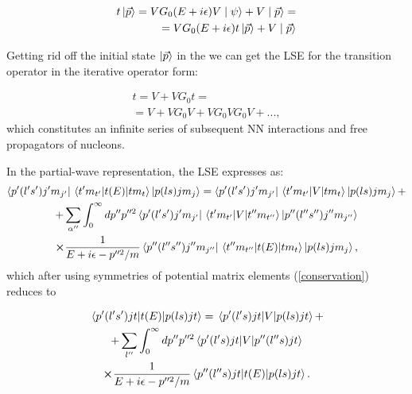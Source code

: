    \begin{eqnarray}
        t \ket{\vec{p}} = V G_0(E + i\epsilon)V \mid \psi \rangle +  V \mid \vec{p} \rangle = \nonumber\\
        = V G_0(E + i\epsilon) t \ket{\vec{p}} +  V \mid \vec{p} \rangle
        \label{top2}
    \end{eqnarray}

    Getting rid off the initial state $\ket{\vec{p}}$ in the  we can get the LSE
    for the transition operator in the iterative operator form:

    \begin{eqnarray}
        t = V + V G_0 t = \nonumber\\
        = V + V G_0 V + V G_0 V G_0V + ...,
        \label{lse_gen}
    \end{eqnarray}
    which constitutes an infinite series of subsequent NN interactions and free propagators of nucleons.

    In the partial-wave representation, the LSE  expresses as:
    \begin{multline}
        \bra{p^\prime (l^\prime s^\prime)j'm_{j'}}\matrixel{t' m_{t'}}{t(E)}{t m_t}\ket{p (l s)jm_{j}} = 
        \bra{p^\prime (l^\prime s^\prime)j'm_{j'}}\matrixel{t' m_{t'}}{V}{t m_t}\ket{p (l s)jm_{j}} + \\
        +\sum_{\alpha^{\prime\prime}} \int_0^\infty dp^{\prime \prime} p^{\prime \prime 2}
        \bra{p^\prime (l^\prime s^\prime)j'm_{j'}}\matrixel{t' m_{t'}}{V}
        {t'' m_{t''}}\ket{p'' (l'' s'')j''m_{j''}} \\
        \cross \frac{1}{E + i\epsilon - p^{\prime \prime 2}/m}
        \bra{p'' (l'' s'')j''m_{j''}}\matrixel{t'' m_{t''}}{t(E)}{t m_t}\ket{p (l s)jm_{j}},
        \label{lse_pwd}
    \end{multline}
    which after using symmetries of potential matrix elements (\ref{conservation}) reduces to
    
    \begin{multline}
        \matrixel{p^\prime (l^\prime s^\prime)jt}{t(E)}{p(ls)jt} = 
        \matrixel{p^\prime (l^\prime s)jt}{V}{p(ls)jt} + \\
        +\sum_{l^{\prime\prime}} \int_0^\infty dp^{\prime \prime} p^{\prime \prime 2}
        \matrixel{p^\prime (l^\prime s)jt}{V}{p^{\prime\prime}(l^{\prime\prime} s)jt} \\
        \cross \frac{1}{E + i\epsilon - p^{\prime \prime 2}/m}
        \matrixel{p^{\prime \prime} (l^{\prime \prime} s)jt}{t(E)}{p(l s)jt}.      
        \label{lse_pwd_reduced}
    \end{multline}

